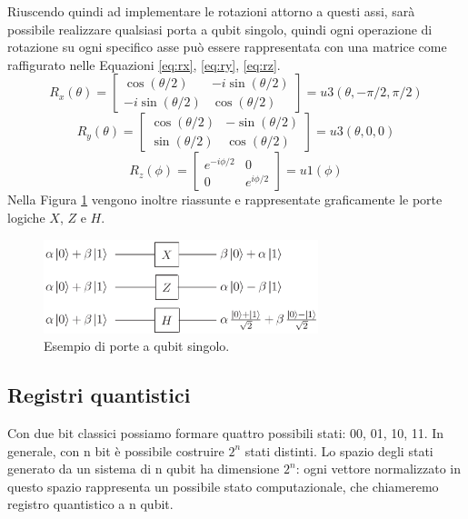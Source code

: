 Riuscendo quindi ad implementare le rotazioni attorno a questi assi, sarà possibile realizzare qualsiasi porta a qubit singolo, quindi ogni operazione di rotazione su ogni specifico asse può essere rappresentata con una matrice come raffigurato nelle Equazioni \ref{eq:rx}, \ref{eq:ry}, \ref{eq:rz}.
\begin{equation}
    \label{eq:rx}
    R_x(\theta) =
    \begin{bmatrix}
       \cos{(\theta/2)} & -i\sin{(\theta/2)}\\
        -i\sin{(\theta/2)} & \cos{(\theta/2)}
    \end{bmatrix} =
    u3(\theta,-\pi/2,\pi/2)
\end{equation}
\begin{equation}
    \label{eq:ry}
    R_y(\theta) =
    \begin{bmatrix}
       \cos{(\theta/2)} & -\sin{(\theta/2)}\\
        \sin{(\theta/2)} & \cos{(\theta/2)}
    \end{bmatrix} =
    u3(\theta,0,0)
\end{equation}
\begin{equation}
    \label{eq:rz}
    R_z(\phi) =
    \begin{bmatrix}
       e^{-i\phi/2} & 0\\
        0 & e^{i\phi/2}
    \end{bmatrix} =
    u1(\phi)
\end{equation}
Nella Figura \ref{fig:porte_logice_singolo_qubit} vengono inoltre riassunte e rappresentate graficamente le porte logiche $X$, $Z$ e $H$.
\begin{figure}[htp]
    \centering
    \includegraphics[width=8cm]{Images/Capitolo2/porte_logice_singolo_qubit.png}
    \caption{Esempio di porte a qubit singolo.}
    \label{fig:porte_logice_singolo_qubit}
\end{figure}
\newline
\subsection{Registri quantistici}
Con due bit classici possiamo formare quattro possibili stati: 00, 01, 10, 11.
In generale, con n bit è possibile costruire $2^n$ stati distinti.
Lo spazio degli stati generato da un sistema di n qubit ha dimensione $2^n$: ogni vettore normalizzato in questo spazio rappresenta un possibile stato computazionale, che chiameremo registro quantistico a n qubit.

